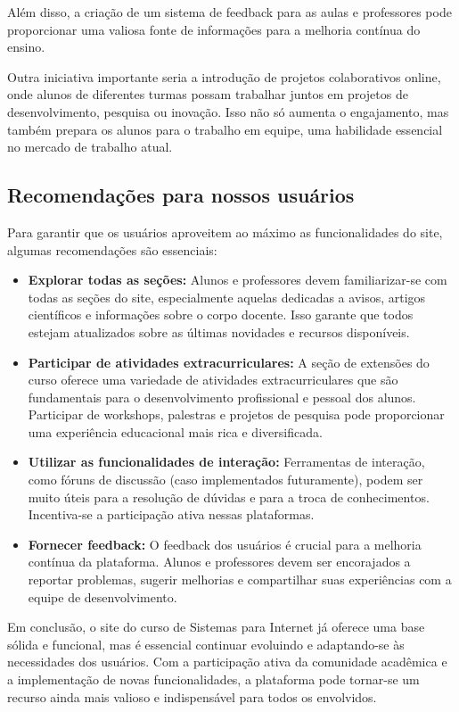 \documentclass[a4paper,12pt]{report}
\begin{document}
Além disso, a criação de um sistema de feedback para as aulas e professores pode proporcionar uma valiosa fonte de informações para a melhoria contínua do ensino. 

Outra iniciativa importante seria a introdução de projetos colaborativos online, onde alunos de diferentes turmas possam trabalhar juntos em projetos de desenvolvimento, pesquisa ou inovação. Isso não só aumenta o engajamento, mas também prepara os alunos para o trabalho em equipe, uma habilidade essencial no mercado de trabalho atual. 

\subsection{Recomendações para nossos usuários} 
Para garantir que os usuários aproveitem ao máximo as funcionalidades do site, algumas recomendações são essenciais: 

\begin{itemize} 

    \item \textbf{Explorar todas as seções:} Alunos e professores devem familiarizar-se com todas as seções do site, especialmente aquelas dedicadas a avisos, artigos científicos e informações sobre o corpo docente. Isso garante que todos estejam atualizados sobre as últimas novidades e recursos disponíveis. 

    \item \textbf{Participar de atividades extracurriculares:} A seção de extensões do curso oferece uma variedade de atividades extracurriculares que são fundamentais para o desenvolvimento profissional e pessoal dos alunos. Participar de workshops, palestras e projetos de pesquisa pode proporcionar uma experiência educacional mais rica e diversificada. 

    \item \textbf{Utilizar as funcionalidades de interação:} Ferramentas de interação, como fóruns de discussão (caso implementados futuramente), podem ser muito úteis para a resolução de dúvidas e para a troca de conhecimentos. Incentiva-se a participação ativa nessas plataformas. 

    \item \textbf{Fornecer feedback:} O feedback dos usuários é crucial para a melhoria contínua da plataforma. Alunos e professores devem ser encorajados a reportar problemas, sugerir melhorias e compartilhar suas experiências com a equipe de desenvolvimento.

\end{itemize}

Em conclusão, o site do curso de Sistemas para Internet já oferece uma base sólida e funcional, mas é essencial continuar evoluindo e adaptando-se às necessidades dos usuários. Com a participação ativa da comunidade acadêmica e a implementação de novas funcionalidades, a plataforma pode tornar-se um recurso ainda mais valioso e indispensável para todos os envolvidos.
\end{document}
